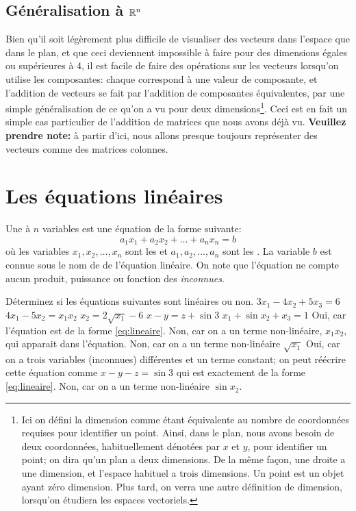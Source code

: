 \subsection{Généralisation à $\mathbb{R}^n$}
Bien qu'il soit légèrement plus difficile de visualiser des vecteurs dans l'espace que dans le plan, et que ceci deviennent impossible
à faire pour des dimensions égales ou supérieures à 4, il est facile de faire des opérations sur les vecteurs lorsqu'on utilise
les composantes: chaque  correspond à une valeur de composante, et l'addition de vecteurs
se fait par l'addition de composantes équivalentes, par une simple généralisation de ce qu'on a vu pour deux
dimensions\footnote{Ici on défini la dimension comme étant équivalente au nombre de coordonnées requises pour
identifier un point.  Ainsi, dans le plan, nous avons besoin de deux coordonnées, habituellement dénotées
par $x$ et $y$, pour identifier un point; on dira qu'un plan a deux dimensions.  De la même façon,
une droite a une dimension, et l'espace habituel a trois dimensions.  Un point est un objet ayant zéro dimension.
Plus tard, on verra une autre définition de dimension, lorsqu'on étudiera les espaces vectoriels.}.  
Ceci est en fait un simple cas particulier de l'addition de matrices que nous avons déjà vu.
\textbf{Veuillez prendre note:} à partir d'ici, nous allons presque toujours représenter des vecteurs comme des
matrices colonnes.
%

\section{Les équations linéaires}

Une  à $n$ variables est une équation de la forme suivante:
\begin{equation}
a_1x_1 + a_2x_2 + \ldots + a_n x_n = b \label{eq:lineaire}
\end{equation}
où les variables $x_1, x_2, \ldots, x_n$ sont les  et $a_1, a_2, \ldots, a_n$
sont les .  La variable $b$ est connue sous le nom de  de
l'équation linéaire.  On note que l'équation ne compte aucun produit, puissance ou fonction
des \textit{inconnues}.

\begin{exemple}
	Déterminez si les équations suivantes sont linéaires ou non.
	 $3x_1 - 4x_2 + 5x_3 = 6$
	 $4x_1 - 5x_2 = x_1 x_2$
	 $x_2 = 2\sqrt{x_1} - 6$
	 $x - y = z + \sin 3$
	 $x_1 + \sin x_2 + x_3 = 1$
	\solution
	 Oui, car l'équation est de la forme \eqref{eq:lineaire}.
	 Non, car on a un terme non-linéaire, $x_1 x_2$, qui apparait dans l'équation.
	 Non, car on a un terme non-linéaire $\sqrt{x_1}$
	 Oui, car on a trois variables (inconnues) différentes et un terme constant; on peut réécrire
	cette équation comme $x - y - z = \sin 3$ qui est exactement de la forme \eqref{eq:lineaire}.
	 Non, car on a un terme non-linéaire $\sin x_2$.
\end{exemple}

